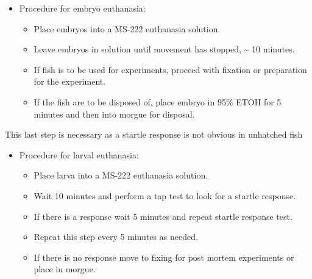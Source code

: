 \documentclass[
  letterpaper,
  DIV=11,
  numbers=noendperiod]{scrreprt}
\providecommand{\tightlist}{%
  \setlength{\itemsep}{0pt}\setlength{\parskip}{0pt}}\usepackage{longtable,booktabs,array}
\begin{document}
\begin{itemize}
\item
  Procedure for embryo euthanasia:

  \begin{itemize}
  \tightlist
  \item
    Place embryos into a MS-222 euthanasia solution.
  \item
    Leave embryos in solution until movement has stopped,
    \textasciitilde{} 10 minutes.
  \item
    If fish is to be used for experiments, proceed with fixation or
    preparation for the experiment.
  \item
    If the fish are to be disposed of, place embryo in 95\% ETOH for 5
    minutes and then into morgue for disposal.
  \end{itemize}
\end{itemize}

\begin{tcolorbox}[enhanced jigsaw, rightrule=.15mm, title=\textcolor{quarto-callout-warning-color}{\faExclamationTriangle}\hspace{0.5em}{NOTES}, titlerule=0mm, opacitybacktitle=0.6, toprule=.15mm, bottomrule=.15mm, opacityback=0, left=2mm, colframe=quarto-callout-warning-color-frame, breakable, coltitle=black, colback=white, colbacktitle=quarto-callout-warning-color!10!white, bottomtitle=1mm, leftrule=.75mm, toptitle=1mm, arc=.35mm]

This last step is necessary as a startle response is not obvious in
unhatched fish

\end{tcolorbox}

\begin{itemize}
\item
  Procedure for larval euthanasia:

  \begin{itemize}
  \tightlist
  \item
    Place larva into a MS-222 euthanasia solution.
  \item
    Wait 10 minutes and perform a tap test to look for a startle
    response.
  \item
    If there is a response wait 5 minutes and repeat startle response
    test.
  \item
    Repeat this step every 5 minutes as needed.
  \item
    If there is no response move to fixing for post mortem experiments
    or place in morgue.
  \end{itemize}
\end{itemize}
\end{document}
